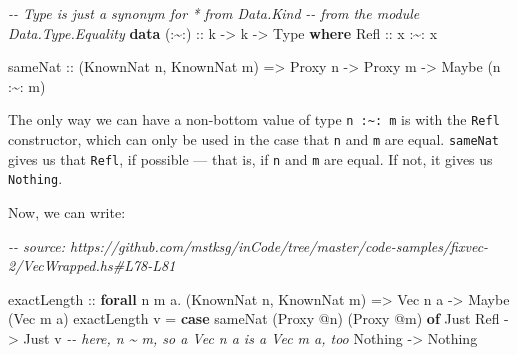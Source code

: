 \documentclass[]{article}
\newenvironment{Shaded}{}{}
\newcommand{\CommentTok}[1]{\textcolor[rgb]{0.38,0.63,0.69}{\textit{#1}}}
\newcommand{\DataTypeTok}[1]{\textcolor[rgb]{0.56,0.13,0.00}{#1}}
\newcommand{\KeywordTok}[1]{\textcolor[rgb]{0.00,0.44,0.13}{\textbf{#1}}}
\newcommand{\NormalTok}[1]{#1}
\newcommand{\OperatorTok}[1]{\textcolor[rgb]{0.40,0.40,0.40}{#1}}
\newcommand{\OtherTok}[1]{\textcolor[rgb]{0.00,0.44,0.13}{#1}}
\begin{document}
\begin{Shaded}
\begin{Highlighting}[]
\CommentTok{{-}{-} \textasciigrave{}Type\textasciigrave{} is just a synonym for * from Data.Kind}
\CommentTok{{-}{-} from the module Data.Type.Equality}
\KeywordTok{data}\OtherTok{ (:\textasciitilde{}:) ::}\NormalTok{ k }\OtherTok{{-}>}\NormalTok{ k }\OtherTok{{-}>} \DataTypeTok{Type} \KeywordTok{where}
    \DataTypeTok{Refl}\OtherTok{ ::}\NormalTok{ x }\OperatorTok{:\textasciitilde{}:}\NormalTok{ x}

\NormalTok{sameNat}
\OtherTok{    ::}\NormalTok{ (}\DataTypeTok{KnownNat}\NormalTok{ n, }\DataTypeTok{KnownNat}\NormalTok{ m)}
    \OtherTok{=>} \DataTypeTok{Proxy}\NormalTok{ n}
    \OtherTok{{-}>} \DataTypeTok{Proxy}\NormalTok{ m}
    \OtherTok{{-}>} \DataTypeTok{Maybe}\NormalTok{ (n }\OperatorTok{:\textasciitilde{}:}\NormalTok{ m)}
\end{Highlighting}
\end{Shaded}

The only way we can have a non-bottom value of type
\texttt{n\ :\textasciitilde{}:\ m} is with the \texttt{Refl} constructor, which
can only be used in the case that \texttt{n} and \texttt{m} are equal.
\texttt{sameNat} gives us that \texttt{Refl}, if possible --- that is, if
\texttt{n} and \texttt{m} are equal. If not, it gives us \texttt{Nothing}.

Now, we can write:

\begin{Shaded}
\begin{Highlighting}[]
\CommentTok{{-}{-} source: https://github.com/mstksg/inCode/tree/master/code{-}samples/fixvec{-}2/VecWrapped.hs\#L78{-}L81}

\OtherTok{exactLength ::} \KeywordTok{forall}\NormalTok{ n m a}\OperatorTok{.}\NormalTok{ (}\DataTypeTok{KnownNat}\NormalTok{ n, }\DataTypeTok{KnownNat}\NormalTok{ m) }\OtherTok{=>} \DataTypeTok{Vec}\NormalTok{ n a }\OtherTok{{-}>} \DataTypeTok{Maybe}\NormalTok{ (}\DataTypeTok{Vec}\NormalTok{ m a)}
\NormalTok{exactLength v }\OtherTok{=} \KeywordTok{case}\NormalTok{ sameNat (}\DataTypeTok{Proxy} \OperatorTok{@}\NormalTok{n) (}\DataTypeTok{Proxy} \OperatorTok{@}\NormalTok{m) }\KeywordTok{of}
    \DataTypeTok{Just} \DataTypeTok{Refl} \OtherTok{{-}>} \DataTypeTok{Just}\NormalTok{ v     }\CommentTok{{-}{-} here, n \textasciitilde{} m, so a \textasciigrave{}Vec n a\textasciigrave{} is a \textasciigrave{}Vec m a\textasciigrave{}, too}
    \DataTypeTok{Nothing}   \OtherTok{{-}>} \DataTypeTok{Nothing}
\end{Highlighting}
\end{Shaded}
\end{document}
